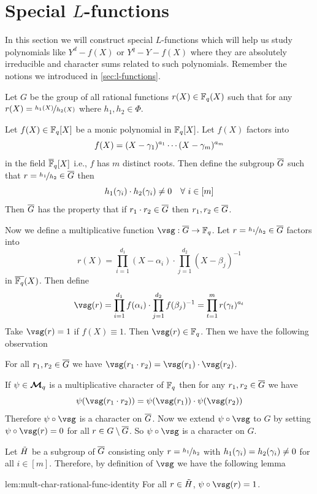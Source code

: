 \section{Special \texorpdfstring{$L$}{ L }-functions}\label{sec:special-l-functions}
%
In this section we will construct special $L$-functions which will help us study polynomials like $Y^d-f(X)$ or $Y^q-Y-f(X)$ where they are absolutely irreducible and character sums related to such polynomials. Remember the notions we introduced in \autoref{sec:l-functions}.

Let $G$ be the group of all rational functions $r(X)\in\mathbb{F}_q(X)$ such that for any $r(X)=\nicefrac{h_1(X)}{h_2(X)}$ where $h_1,h_2\in\Phi$. 

Let $f(X)\in\mathbb{F}_q[X]$ be a monic polynomial in $\mathbb{F}_q[X]$. Let $f(X)$ factors into $$f(X)=(X-\gamma_1)^{a_1}\cdots (X-\gamma_m)^{a_m}$$ in the field $\overline{\mathbb{F}}_q[X]$ i.e., $f$ has $m$ distinct roots. Then define the subgroup $\overline{G}$ such that $r=\nicefrac{h_1}{h_2}\in\overline{G}$ then $$h_1(\gm_i)\cdot h_2(\gm_i)\neq 0\quad\forall\ i\in[m]$$Then $\overline{G}$ has the property that if $r_1\cdot r_2\in\overline{G}$ then $r_1,r_2\in \overline{G}$. 

Now we define a multiplicative function $\vsg:\ovG\to \bbF_q$. Let $r=\nicefrac{h_1}{h_2}\in\overline{G}$ factors into $$r(X)=\prod_{i=1}^{d_1}(X-\alpha_i)\cdot \prod_{j=1}^{d_2}(X-\beta_j)^{-1}$$ in $\overline{\mathbb{F}_q}(X)$. Then define $$\vsg(r)=\prod_{i=1}^{d_1}f(\alpha_i)\cdot \prod_{j=1}^{d_2}f(\beta_j)^{-1}=\prod_{t=1}^mr(\gm_t)^{a_t}$$Take $\vsg(r)=1$ if $f(X)\equiv 1$. Then $\vsg(r)\in\bbF_q$. Then we have the following observation
\begin{observation}
  For all  $r_1,r_2\in\overline{G}$ we have $\vsg(r_1\cdot r_2)=\vsg(r_1)\cdot \vsg(r_2)$. 
\end{observation}
If $\psi\in\boldsymbol{\mathcal{M}}_q$ is a multiplicative character of $\mathbb{F}_q$ then for any $r_1,r_2\in\overline{G}$ we have $$\psi(\vsg(r_1\cdot r_2))=\psi(\vsg(r_1))\cdot \psi(\vsg(r_2))$$Therefore $\psi\circ \vsg$ is a character on $\overline{G}$. Now we extend $\psi\circ\vsg$ to $G$ by setting $\psi\circ\vsg(r)=0$ for all $r\in G\setminus \overline{G}$. So $\psi\circ \vsg$ is a character on $G$. 

Let $\tilde{H}$ be a subgroup of $\overline{G}$ consisting only $r=\nicefrac{h_1}{h_2}$ with $h_1(\gamma_i)=h_2(\gamma_i)\neq 0$ for all $i\in[m]$. Therefore, by definition of $\vsg$ we have the following lemma 
\begin{lemma}{}{lem:mult-char-rational-func-identity}
  For all $r\in\tilde{H}$, $\psi\circ \vsg(r)=1$. 
\end{lemma}

